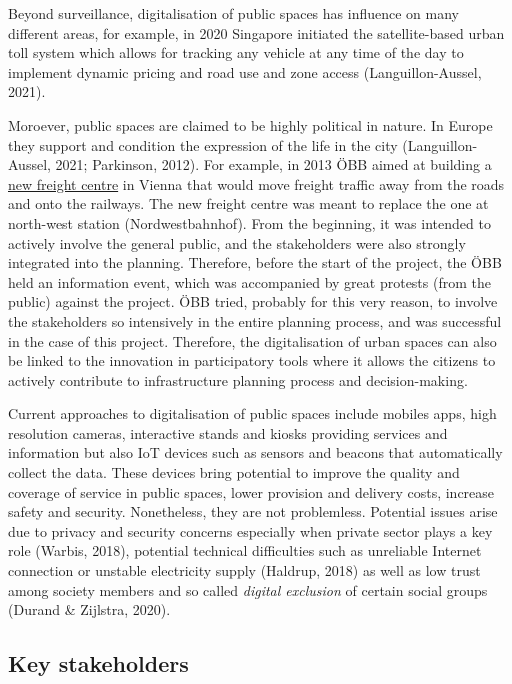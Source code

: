 \documentclass[
]{book}
\begin{document}
Beyond surveillance, digitalisation of public spaces has influence on many different areas, for example, in 2020 Singapore initiated the satellite-based urban toll system which allows for tracking any vehicle at any time of the day to implement dynamic pricing and road use and zone access (Languillon-Aussel, 2021).

Moroever, public spaces are claimed to be highly political in nature. In Europe they support and condition the expression of the life in the city (Languillon-Aussel, 2021; Parkinson, 2012). For example, in 2013 ÖBB aimed at building a \href{https://www.partizipation.at/gueterzentrum_sued.html}{new freight centre} in Vienna that would move freight traffic away from the roads and onto the railways. The new freight centre was meant to replace the one at north-west station (Nordwestbahnhof). From the beginning, it was intended to actively involve the general public, and the stakeholders were also strongly integrated into the planning. Therefore, before the start of the project, the ÖBB held an information event, which was accompanied by great protests (from the public) against the project. ÖBB tried, probably for this very reason, to involve the stakeholders so intensively in the entire planning process, and was successful in the case of this project. Therefore, the digitalisation of urban spaces can also be linked to the innovation in participatory tools where it allows the citizens to actively contribute to infrastructure planning process and decision-making.

Current approaches to digitalisation of public spaces include mobiles apps, high resolution cameras, interactive stands and kiosks providing services and information but also IoT devices such as sensors and beacons that automatically collect the data. These devices bring potential to improve the quality and coverage of service in public spaces, lower provision and delivery costs, increase safety and security. Nonetheless, they are not problemless. Potential issues arise due to privacy and security concerns especially when private sector plays a key role (Warbis, 2018), potential technical difficulties such as unreliable Internet connection or unstable electricity supply (Haldrup, 2018) as well as low trust among society members and so called \emph{digital exclusion} of certain social groups (Durand \& Zijlstra, 2020).

\hypertarget{key-stakeholders-3}{%
\subsection*{Key stakeholders}\label{key-stakeholders-3}}
\end{document}
